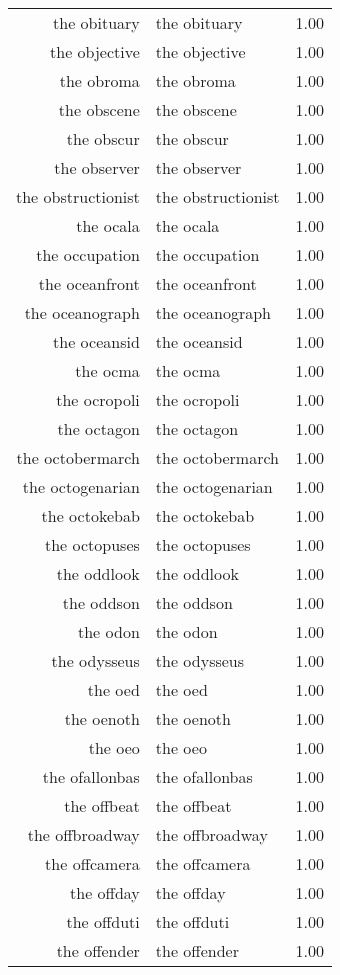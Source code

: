 \begin{table}[ht]
\begin{tabular}{rlr}
  the obituary & the obituary & 1.00 \\ 
  the objective & the objective & 1.00 \\ 
  the obroma & the obroma & 1.00 \\ 
  the obscene & the obscene & 1.00 \\ 
  the obscur & the obscur & 1.00 \\ 
  the observer & the observer & 1.00 \\ 
  the obstructionist & the obstructionist & 1.00 \\ 
  the ocala & the ocala & 1.00 \\ 
  the occupation & the occupation & 1.00 \\ 
  the oceanfront & the oceanfront & 1.00 \\ 
  the oceanograph & the oceanograph & 1.00 \\ 
  the oceansid & the oceansid & 1.00 \\ 
  the ocma & the ocma & 1.00 \\ 
  the ocropoli & the ocropoli & 1.00 \\ 
  the octagon & the octagon & 1.00 \\ 
  the octobermarch & the octobermarch & 1.00 \\ 
  the octogenarian & the octogenarian & 1.00 \\ 
  the octokebab & the octokebab & 1.00 \\ 
  the octopuses & the octopuses & 1.00 \\ 
  the oddlook & the oddlook & 1.00 \\ 
  the oddson & the oddson & 1.00 \\ 
  the odon & the odon & 1.00 \\ 
  the odysseus & the odysseus & 1.00 \\ 
  the oed & the oed & 1.00 \\ 
  the oenoth & the oenoth & 1.00 \\ 
  the oeo & the oeo & 1.00 \\ 
  the ofallonbas & the ofallonbas & 1.00 \\ 
  the offbeat & the offbeat & 1.00 \\ 
  the offbroadway & the offbroadway & 1.00 \\ 
  the offcamera & the offcamera & 1.00 \\ 
  the offday & the offday & 1.00 \\ 
  the offduti & the offduti & 1.00 \\ 
  the offender & the offender & 1.00 \\ 

\end{tabular}
\end{table}
